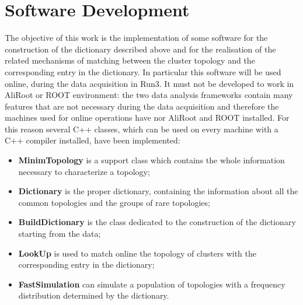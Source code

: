 \section{Software Development}
The objective of this work is the implementation of some software for the construction of the dictionary described above and for the realisation of the related mechanisms of matching between the cluster topology and the corresponding entry in the dictionary. In particular this software will be used online, during the data acquisition in Run3. It must not be developed to work in AliRoot or ROOT environment: the two data analysis frameworks contain many features that are not necessary during the data acquisition and therefore the machines used for online operations have nor AliRoot and ROOT installed. For this reason several C++ classes, which can be used on every machine with a C++ compiler installed, have been implemented:
\begin{itemize}
 \item \textbf{MinimTopology} is a support class which contains the whole information necessary to characterize a topology;
 \item \textbf{Dictionary} is the proper dictionary, containing the information about all the common topologies and the groups of rare topologies;
 \item \textbf{BuildDictionary} is the class dedicated to the construction of the dictionary starting from the data;
 \item \textbf{LookUp} is used to match online the topology of clusters with the corresponding entry in the dictionary;
 \item \textbf{FastSimulation} can simulate a population of topologies with a frequency distribution determined by the dictionary. 
\end{itemize}
